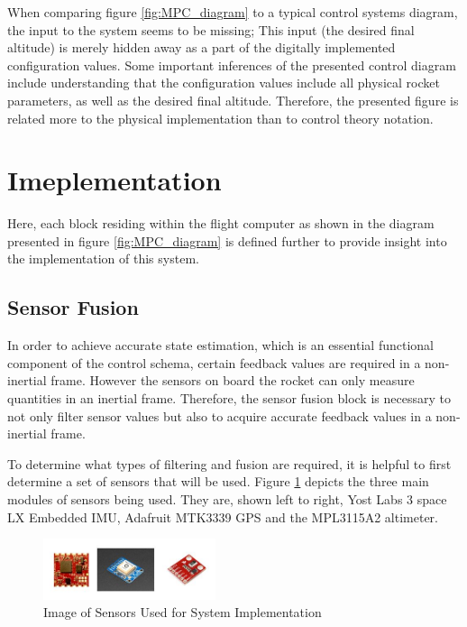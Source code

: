 \documentclass[conference, letterpaper]{IEEEtran}
\begin{document}
When comparing figure \ref{fig:MPC_diagram} to a
typical control systems diagram, the input to the system seems to be missing;
This input (the desired final altitude) is merely hidden away as a part of the
digitally implemented configuration values. Some important inferences of the
presented control diagram include understanding that the configuration values
include all physical rocket parameters, as well as the desired final altitude.
Therefore, the presented figure is related more to the physical implementation
than to control theory notation.

\section{Imeplementation}

Here, each block residing within the flight computer as shown in
the diagram presented in figure \ref{fig:MPC_diagram} is
defined further to provide insight into the implementation of this
system.

\subsection{Sensor Fusion}

In order to achieve accurate state estimation, which is an essential functional
component of the control schema, certain feedback values are required in a
non-inertial frame. However the sensors on board the rocket can only measure
quantities in an inertial frame. Therefore, the sensor fusion block is necessary
to not only filter sensor values but also to acquire accurate feedback values in
a non-inertial frame.

To determine what types of filtering and fusion are required, it is helpful to
first determine a set of sensors that will be used. Figure \ref{fig:sensors}
depicts the three main modules of sensors being used. They are, shown left to right,
Yost Labs 3 space LX Embedded IMU, Adafruit MTK3339 GPS and the MPL3115A2 altimeter.

\begin{figure}[H]
\centering
\includegraphics[width=0.45\textwidth]{./sensors}
\caption{Image of Sensors Used for System Implementation}
\label{fig:sensors}
\end{figure}
\end{document}
